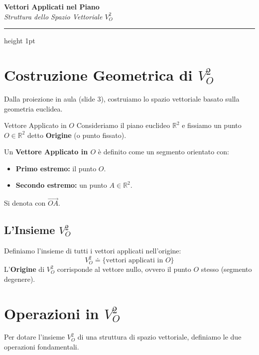 \setlength{\parindent}{0pt}
\setlength{\parskip}{6pt}

\begin{center}
    {\Huge \textbf{\color{cherryRed} Vettori Applicati nel Piano}} \\
    \vspace{0.3cm}
    {\Large \textit{Struttura dello Spazio Vettoriale $V_O^2$}}
    \vspace{0.5cm}
    \hrule height 1pt
\end{center}

\section{Costruzione Geometrica di $V_O^2$}

Dalla proiezione in aula (slide 3), costruiamo lo spazio vettoriale basato sulla geometria euclidea.

\begin{definition}{Vettore Applicato in $O$}{}
Consideriamo il piano euclideo $\mathbb{R}^2$ e fissiamo un punto $O \in \mathbb{R}^2$ detto \textbf{Origine} (o punto fissato).

Un \textbf{Vettore Applicato in $O$} è definito come un segmento orientato con:
\begin{itemize}
    \item \textbf{Primo estremo:} il punto $O$.
    \item \textbf{Secondo estremo:} un punto $A \in \mathbb{R}^2$.
\end{itemize}
Si denota con $\overrightarrow{OA}$.
\end{definition}

\subsection{L'Insieme $V_O^2$}
Definiamo l'insieme di tutti i vettori applicati nell'origine:
\[
V_O^2 \doteq \{ \text{vettori applicati in } O \}
\]
L'\textbf{Origine} di $V_O^2$ corrisponde al vettore nullo, ovvero il punto $O$ stesso (segmento degenere).

\section{Operazioni in $V_O^2$}

Per dotare l'insieme $V_O^2$ di una struttura di spazio vettoriale, definiamo le due operazioni fondamentali.

